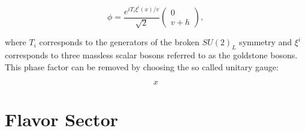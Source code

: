 \begin{equation}
\phi=\frac{e^{iT_{i}\xi^{i}(x)/v}}{\sqrt{2}}\begin{pmatrix}0\\v+h\end{pmatrix},
\end{equation}

where $T_{i}$ corresponds to the generators of the broken $SU(2)_{L}$ symmetry and $\xi^{i}$ corresponds to three massless scalar bosons referred to as the goldstone bosons. This phase factor can be removed by choosing the so called unitary gauge:

\begin{equation}
x
\end{equation}

\section{Flavor Sector}
\label{sec:Flavor}